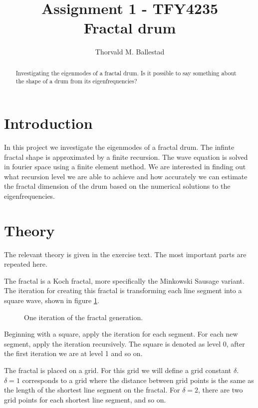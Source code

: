 \documentclass[a4paper, 12pt]{article}
\author{Thorvald M. Ballestad}
\title{Assignment 1 - TFY4235\\
  Fractal drum}
\begin{document}
\maketitle

\begin{abstract}
  Investigating the eigenmodes of a fractal drum.
  Is it possible to say something about the shape of a drum from its eigenfrequencies?
\end{abstract}

\section{Introduction}
In this project we investigate the eigenmodes of a fractal drum.
The infinte fractal shape is approximated by a finite recursion.
The wave equation is solved in fourier space using a finite element method.
We are interested in finding out what recursion level we are able to achieve and how accurately we can estimate the fractal dimension of the drum based on the numerical solutions to the eigenfrequencies.

\section{Theory}
The relevant theory is given in the exercise text\cite{exercise}.
The most important parts are repeated here.

The fractal is a Koch fractal, more specifically the Minkowski Sausage variant\cite{wiki:Koch}.
The iteration for creating this fractal is transforming each line segment into a square wave, shown in figure \ref{fig:fractal-transform}.
\begin{figure}[h]
  \centering
  \caption{One iteration of the fractal generation.}
  \label{fig:fractal-transform}
\end{figure}
Beginning with a square, apply the iteration for each segment.
For each new segment, apply the iteration recursively.
The square is denoted as level 0, after the first iteration we are at level 1 and so on.

The fractal is placed on a grid.
For this grid we will define a grid constant $\delta$.
$\delta=1$ corresponds to a grid where the distance between grid points is the same as the length of the shortest line segment on the fractal.
For $\delta=2$, there are two grid points for each shortest line segment, and so on.
\end{document}
